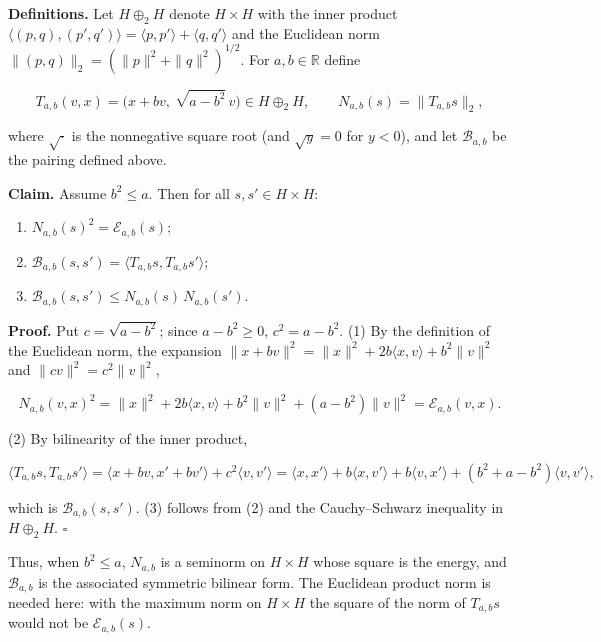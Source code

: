 \documentclass[11pt,a4paper]{article}
\begin{document}
\textbf{Definitions.} Let \(H\oplus_2H\) denote \(H\times H\) with the inner product \(\langle(p,q),(p',q')\rangle=\langle p,p'\rangle+\langle q,q'\rangle\) and the Euclidean norm \(\|(p,q)\|_2=(\|p\|^2+\|q\|^2)^{1/2}\). For \(a,b\in\mathbb R\) define


\[T_{a,b}(v,x)=\bigl(x+bv,\ \sqrt{a-b^2}\,v\bigr)\in H\oplus_2H,\qquad N_{a,b}(s)=\|T_{a,b}s\|_2,\]


where \(\sqrt{\cdot}\) is the nonnegative square root (and \(\sqrt y=0\) for \(y<0\)), and let \(\mathcal B_{a,b}\) be the pairing defined above.




\textbf{Claim.} Assume \(b^2\le a\). Then for all \(s,s'\in H\times H\):



\begin{enumerate}


\item \(N_{a,b}(s)^2=\mathcal E_{a,b}(s)\);

\item \(\mathcal B_{a,b}(s,s')=\langle T_{a,b}s,T_{a,b}s'\rangle\);

\item \(\mathcal B_{a,b}(s,s')\le N_{a,b}(s)\,N_{a,b}(s')\).

\end{enumerate}



\textbf{Proof.} Put \(c=\sqrt{a-b^2}\); since \(a-b^2\ge0\), \(c^2=a-b^2\). (1) By the definition of the Euclidean norm, the expansion \(\|x+bv\|^2=\|x\|^2+2b\langle x,v\rangle+b^2\|v\|^2\) and \(\|cv\|^2=c^2\|v\|^2\),


\[N_{a,b}(v,x)^2=\|x\|^2+2b\langle x,v\rangle+b^2\|v\|^2+(a-b^2)\|v\|^2=\mathcal E_{a,b}(v,x).\]


(2) By bilinearity of the inner product,


\[\langle T_{a,b}s,T_{a,b}s'\rangle=\langle x+bv,x'+bv'\rangle+c^2\langle v,v'\rangle=\langle x,x'\rangle+b\langle x,v'\rangle+b\langle v,x'\rangle+(b^2+a-b^2)\langle v,v'\rangle,\]


which is \(\mathcal B_{a,b}(s,s')\). (3) follows from (2) and the Cauchy–Schwarz inequality in \(H\oplus_2H\). \(\square\)




Thus, when \(b^2\le a\), \(N_{a,b}\) is a seminorm on \(H\times H\) whose square is the energy, and \(\mathcal B_{a,b}\) is the associated symmetric bilinear form. The Euclidean product norm is needed here: with the maximum norm on \(H\times H\) the square of the norm of \(T_{a,b}s\) would not be \(\mathcal E_{a,b}(s)\).
\end{document}
